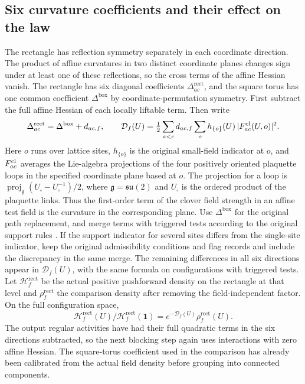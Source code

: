 \documentclass[11pt,a4paper]{article}
\numberwithin{equation}{section}
\begin{document}
\subsection{Six curvature coefficients and their effect on the law}

The rectangle has reflection symmetry separately in each coordinate direction. The product of affine curvatures in two distinct coordinate planes changes sign under at least one of these reflections, so the cross terms of the affine Hessian vanish. The rectangle has six diagonal coefficients \(\Delta_{ac}^{\mathrm{rect}}\), and the square torus has one common coefficient \(\Delta^{\mathrm{box}}\) by coordinate-permutation symmetry. First subtract the full affine Hessian of each locally liftable term. Then write
\begin{equation}
 \Delta_{ac}^{\mathrm{rect}}=\Delta^{\mathrm{box}}+d_{ac,f},\qquad
 \mathcal D_f(U)=\tfrac12\sum_{a<c}d_{ac,f}
       \sum_o h_{\{o\}}(U)\,|F^{\rm cl}_{ac}(U,o)|^2 .
 \label{eq:geom-reset}
\end{equation}
Here \(o\) runs over lattice sites, \(h_{\{o\}}\) is the original small-field indicator at \(o\), and \(F^{\rm cl}_{ac}\) averages the Lie-algebra projections of the four positively oriented plaquette loops in the specified coordinate plane based at \(o\). The projection for a loop is \(\operatorname{proj}_{\mathfrak g}(U_\square-U_\square^{-1})/2\), where \(\mathfrak g=\mathfrak{su}(2)\) and \(U_\square\) is the ordered product of the plaquette links. Thus the first-order term of the clover field strength in an affine test field is the curvature in the corresponding plane. Use \(\Delta^{\mathrm{box}}\) for the original path replacement, and merge terms with triggered tests according to the original support rules \cite[Lemmas 13.10--13.13]{armstrong}. If the support indicator for several sites differs from the single-site indicator, keep the original admissibility conditions and flag records and include the discrepancy in the same merge. The remaining differences in all six directions appear in \(\mathcal D_f(U)\), with the same formula on configurations with triggered tests. Let \(\mathcal H_f^{\mathrm{rect}}\) be the actual positive pushforward density on the rectangle at that level and \(\rho_f^{\mathrm{rect}}\) the comparison density after removing the field-independent factor. On the full configuration space,
\[
 \mathcal H_f^{\mathrm{rect}}(U)/\mathcal H_f^{\mathrm{rect}}(\mathbf 1)
   =e^{-\mathcal D_f(U)}\rho_f^{\mathrm{rect}}(U).
\]
The output regular activities have had their full quadratic terms in the six directions subtracted, so the next blocking step again uses interactions with zero affine Hessian. The square-torus coefficient used in the comparison has already been calibrated from the actual field density before grouping into connected components.
\end{document}
